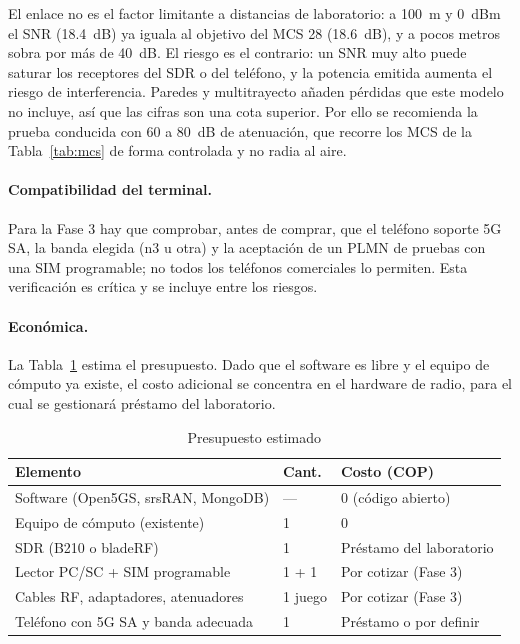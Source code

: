 \documentclass[conference]{IEEEtran}
\begin{document}
El enlace no es el factor limitante a distancias de laboratorio: a 100~m y 0~dBm el SNR (18.4~dB) ya iguala al objetivo del MCS 28 (18.6~dB), y a pocos metros sobra por más de 40~dB. El riesgo es el contrario: un SNR muy alto puede saturar los receptores del SDR o del teléfono, y la potencia emitida aumenta el riesgo de interferencia. Paredes y multitrayecto añaden pérdidas que este modelo no incluye, así que las cifras son una cota superior. Por ello se recomienda la prueba conducida con 60 a 80~dB de atenuación, que recorre los MCS de la Tabla~\ref{tab:mcs} de forma controlada y no radia al aire.

\paragraph{Compatibilidad del terminal.} Para la Fase 3 hay que comprobar, antes de comprar, que el teléfono soporte 5G SA, la banda elegida (n3 u otra) y la aceptación de un PLMN de pruebas con una SIM programable; no todos los teléfonos comerciales lo permiten. Esta verificación es crítica y se incluye entre los riesgos.

\paragraph{Económica.} La Tabla~\ref{tab:costos} estima el presupuesto. Dado que el software es libre y el equipo de cómputo ya existe, el costo adicional se concentra en el hardware de radio, para el cual se gestionará préstamo del laboratorio.

\begin{table}[!t]
\caption{Presupuesto estimado}
\label{tab:costos}
\centering
\footnotesize
\renewcommand{\arraystretch}{1.15}
\begin{tabular}{p{3.6cm}p{1.2cm}p{2.4cm}}
\toprule
\textbf{Elemento} & \textbf{Cant.} & \textbf{Costo (COP)} \\
\midrule
Software (Open5GS, srsRAN, MongoDB) & --- & 0 (código abierto) \\
Equipo de cómputo (existente) & 1 & 0 \\
SDR (B210 o bladeRF) & 1 & Préstamo del laboratorio \\
Lector PC/SC + SIM programable & 1 + 1 & Por cotizar (Fase 3) \\
Cables RF, adaptadores, atenuadores & 1 juego & Por cotizar (Fase 3) \\
Teléfono con 5G SA y banda adecuada & 1 & Préstamo o por definir \\
\bottomrule
\end{tabular}
\end{table}
\end{document}
